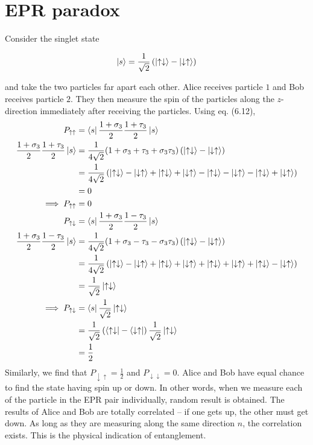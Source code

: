\documentclass[12pt]{book} %
\numberwithin{equation}{chapter}
\def\s{\sigma}
\def\t{\tau}
\begin{document}
\section{EPR paradox}
Consider the singlet state
\begin{eqnbox}
\begin{align}
\ket{s}=\frac{1}{\sqrt{2}}\left(\ket{\uparrow\downarrow}-\ket{\downarrow\uparrow}\right)
\end{align}
\end{eqnbox}
and take the two particles far apart each other. Alice receives particle $1$ and Bob receives particle $2$. They then measure the spin of the particles along the $z$-direction immediately after receiving the particles. Using eq. (6.12),
\begin{align*}
P_{\uparrow\uparrow}&=\bra{s}\frac{1+\s_{3}}{2}\frac{1+\t_{3}}{2}\ket{s}\\
\frac{1+\s_{3}}{2}\frac{1+\t_{3}}{2}\ket{s}&=\frac{1}{4\sqrt{2}}(1+\s_{3}+\t_{3}+\s_{3}\t_{3})\left(\ket{\uparrow\downarrow}-\ket{\downarrow\uparrow}\right)\\
&=\frac{1}{4\sqrt{2}}\left(\ket{\uparrow\downarrow}-\ket{\downarrow\uparrow}+\ket{\uparrow\downarrow}+\ket{\downarrow\uparrow}-\ket{\uparrow\downarrow}-\ket{\downarrow\uparrow}-\ket{\uparrow\downarrow}+\ket{\downarrow\uparrow}\right)\\
&=0\\
\implies P_{\uparrow\uparrow}&=0\\
P_{\uparrow\downarrow}&=\bra{s}\frac{1+\s_{3}}{2}\frac{1-\t_{3}}{2}\ket{s}\\
\frac{1+\s_{3}}{2}\frac{1-\t_{3}}{2}\ket{s}&=\frac{1}{4\sqrt{2}}(1+\s_{3}-\t_{3}-\s_{3}\t_{3})\left(\ket{\uparrow\downarrow}-\ket{\downarrow\uparrow}\right)\\
&=\frac{1}{4\sqrt{2}}\left(\ket{\uparrow\downarrow}-\ket{\downarrow\uparrow}+\ket{\uparrow\downarrow}+\ket{\downarrow\uparrow}+\ket{\uparrow\downarrow}+\ket{\downarrow\uparrow}+\ket{\uparrow\downarrow}-\ket{\downarrow\uparrow}\right)\\
&=\frac{1}{\sqrt{2}}\ket{\uparrow\downarrow}\\
\implies P_{\uparrow\downarrow}&=\bra{s}\frac{1}{\sqrt{2}}\ket{\uparrow\downarrow}\\
&=\frac{1}{\sqrt{2}}\left(\bra{\uparrow\downarrow}-\bra{\downarrow\uparrow}\right)\frac{1}{\sqrt{2}}\ket{\uparrow\downarrow}\\
&=\frac{1}{2}
\end{align*}
Similarly, we find that $P_{\downarrow\uparrow}=\frac{1}{2}$ and $P_{\downarrow\downarrow}=0$. Alice and Bob have equal chance to find the state having spin up or down. In other words, when we measure each of the particle in the EPR pair individually, random result is obtained.\bigskip\newline
The results of Alice and Bob are totally correlated -- if one gets up, the other must get down. As long as they are measuring along the same direction $\hat{n}$, the correlation exists. This is the physical indication of entanglement.
\end{document}
